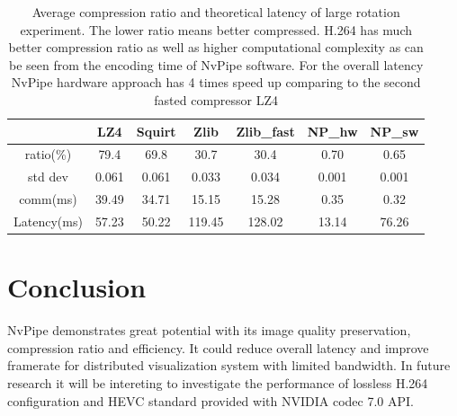 \documentclass[review]{vgtc}                 %
\begin{document}
\begin{table}[htb]
  \caption{Average compression ratio and theoretical latency of large rotation experiment. The lower ratio means better compressed. H.264 has much better compression ratio as well as higher computational complexity as can be seen from the encoding time of NvPipe software. For the overall latency NvPipe hardware approach has 4 times speed up comparing to the second fasted compressor LZ4}
  \label{tab:latency}
  \scriptsize
  \begin{center}
    \begin{tabular}{ccccccc}
      & LZ4 & Squirt & Zlib & Zlib\_fast & NP\_hw & NP\_sw \\
    \hline
      ratio(\%) & 79.4 & 69.8 & 30.7 & 30.4 & 0.70 & 0.65 \\
      std dev & 0.061 & 0.061 & 0.033 & 0.034 & 0.001 & 0.001\\
      comm(ms) & 39.49 & 34.71 & 15.15 & 15.28 & 0.35 & 0.32 \\
      Latency(ms) & 57.23 & 50.22 & 119.45 & 128.02 & 13.14 & 76.26
    \end{tabular}
  \end{center}
\end{table}


\section{Conclusion}


NvPipe demonstrates great potential with its image quality preservation, compression ratio and efficiency. It could reduce overall latency and improve framerate for distributed visualization system with limited bandwidth. In future research it will be intereting to investigate the performance of lossless H.264 configuration and HEVC standard provided with NVIDIA codec 7.0 API.


\pagebreak


\nocite{*}

\end{document}
